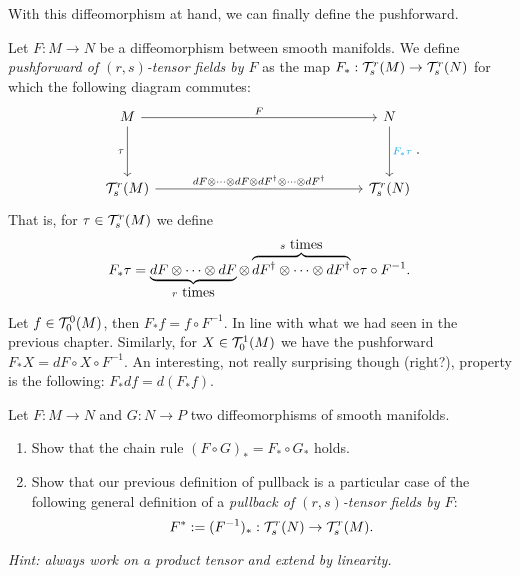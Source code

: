With this diffeomorphism at hand, we can finally define the pushforward.

\begin{definition}
  Let $F:M\to N$ be a diffeomorphism between smooth manifolds.
  We define \emph{pushforward of $(r,s)$-tensor fields by $F$} as the map $F_*: \mathcal{T}_s^r(M) \to \mathcal{T}_s^r(N)$ for which the following diagram commutes:
  \begin{equation}
    \begin{tikzcd}[row sep=huge, column sep=huge]
      M \arrow[r, "F"] \arrow[d, "\tau" left]
      &[10em] N \arrow[d, "F_* \tau" cyan] \\
      \cT_s^r(M) \arrow[r, "dF \otimes\cdots\otimes dF \otimes dF^\dagger \otimes\cdots\otimes dF^\dagger "]
      & \cT_s^r(N)
    \end{tikzcd}.
  \end{equation}
  That is, for $\tau\in\mathcal{T}_s^r(M)$ we define
  \begin{equation}
    F_*\tau = \LaTeXunderbrace{dF \otimes\cdots\otimes dF}_{r\mbox{ times}} \otimes \LaTeXoverbrace{dF^\dagger \otimes\cdots\otimes dF^\dagger }^{s\mbox{ times}} \circ \tau \circ F^{-1}.
  \end{equation}
\end{definition}

\begin{example}
  Let $f\in\mathcal{T}_0^0(M)$, then $F_* f = f\circ F^{-1}$. In line with what we had seen in the previous chapter.
  Similarly, for $X\in\mathcal{T}_0^1(M)$ we have the pushforward $F_* X = dF\circ X \circ F^{-1}$.
  An interesting, not really surprising though (right?), property is the following: $F_* df = d(F_* f)$.
\end{example}

\begin{exercise}
  Let $F:M\to N$ and $G:N\to P$ two diffeomorphisms of smooth manifolds.
  \begin{enumerate}
    \item Show that the chain rule $(F\circ G)_* = F_* \circ G_*$ holds.
    \item Show that our previous definition of pullback is a particular case of the following general definition of a \emph{pullback of $(r,s)$-tensor fields by $F$}:
    \begin{equation}
      F^* := (F^{-1})_* : \mathcal{T}_s^r(N) \to \mathcal{T}_s^r(M).
    \end{equation}
  \end{enumerate}
  \textit{\small Hint: always work on a product tensor and extend by linearity.}
\end{exercise}

